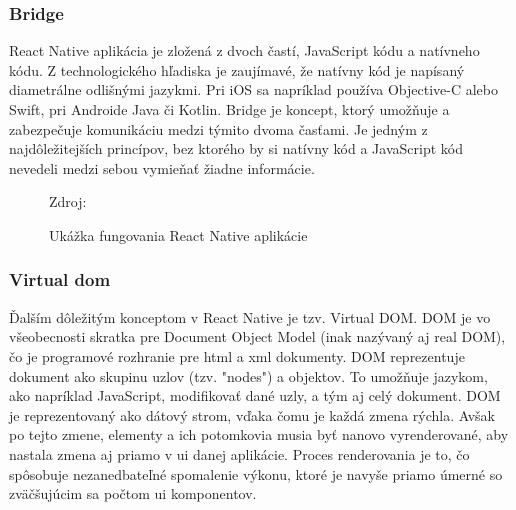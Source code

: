 \subsubsection{Bridge}
React Native aplikácia je zložená z dvoch častí, JavaScript kódu a natívneho kódu. Z technologického hľadiska je zaujímavé, že natívny kód je napísaný diametrálne odlišnými jazykmi. Pri iOS sa napríklad používa Objective-C alebo Swift, pri Androide Java či Kotlin. Bridge je koncept, ktorý umožňuje a zabezpečuje komunikáciu medzi týmito dvoma časťami. Je jedným z najdôležitejších princípov, bez ktorého by si natívny kód a JavaScript kód nevedeli medzi sebou vymieňať žiadne informácie. \cite{rn3}
\begin{figure}[!htbp]
  \centering  
  \def\stackalignment{c}
           {\scriptsize%
            Zdroj: \cite{udemy}}
	\caption{Ukážka fungovania React Native aplikácie}  
  \label{reactAppExplained}
\end{figure}
\subsubsection{Virtual \acrfull{dom}}
Ďalším dôležitým konceptom v React Native je tzv. Virtual DOM. DOM je vo všeobecnosti skratka pre Document Object Model (inak nazývaný aj real DOM), čo je programové rozhranie pre \acrshort{html} a \acrshort{xml} dokumenty. DOM reprezentuje dokument ako skupinu uzlov (tzv. "nodes") a objektov. To umožňuje jazykom, ako napríklad JavaScript, modifikovať dané uzly, a tým aj celý dokument. DOM je reprezentovaný ako dátový strom, vďaka čomu je každá zmena rýchla. Avšak po tejto zmene, elementy a ich potomkovia musia byť nanovo vyrenderované, aby nastala zmena aj priamo v \acrshort{ui} danej aplikácie. Proces renderovania je to, čo spôsobuje nezanedbateľné spomalenie výkonu, ktoré je navyše priamo úmerné so zväčšujúcim sa počtom \acrshort{ui} komponentov.

